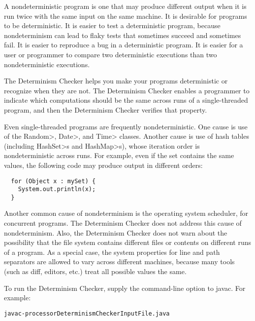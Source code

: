 \htmlhr
{}

A nondeterministic program is one that may produce different output when
it is run twice with the same input on the same machine.
It is desirable for programs to be deterministic.
It is easier to test a deterministic program, because nondeterminism can
lead to flaky tests that sometimes succeed and sometimes fail.
It is easier to reproduce a bug in a deterministic program.
It is easier for a user or programmer to compare two
deterministic executions than two nondeterministic executions.

The Determinism Checker helps you make your programs deterministic or
recognize when they are not.
The Determinism Checker enables a programmer to indicate which
computations should be the same across runs of a single-threaded program,
and then the Determinism Checker verifies that property.

Even single-threaded programs are frequently nondeterministic.
One cause is use of the \<Random>, \<Date>, and \<Time> classes.
Another cause is use of hash tables (including \<HashSet>s and
\<HashMap>s), whose iteration order is nondeterministic across runs.
For example, even if the set contains the same values, the following code
may produce output in different orders:

\begin{Verbatim}
  for (Object x : mySet) {
    System.out.println(x);
  }
\end{Verbatim}

Another common cause of nondeterminism is the operating system scheduler,
for concurrent programs.  The Determinism Checker does not address this
cause of nondeterminism.  Also, the Determinism Checker does not warn
about the possibility that the file system contains different files or
contents on different runs of a program.  As a special case, the system
properties for line and path separators are allowed to vary across
different machines, because many tools (such as diff, editors, etc.)
treat all possible values the same.

To run the Determinism Checker, supply the
command-line option to javac.
For example:

\begin{alltt}
  javac -processor DeterminismChecker InputFile.java
\end{alltt}



